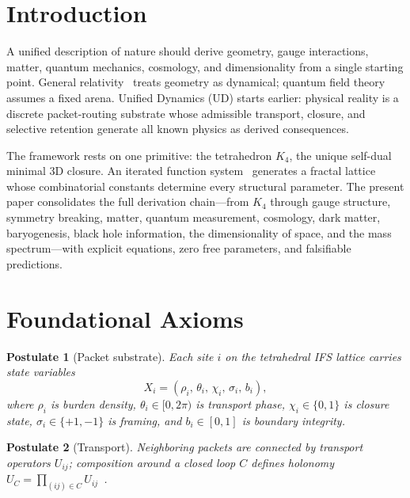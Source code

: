 \documentclass[11pt,twocolumn]{article}
\newtheorem{postulate}{Postulate}
\begin{document}

\section{Introduction}
\label{sec:intro}

A unified description of nature should derive geometry, gauge interactions, matter, quantum mechanics, cosmology, and dimensionality from a single starting point.
General relativity~\cite{einstein1915} treats geometry as dynamical; quantum field theory~\cite{yangmills1954} assumes a fixed arena.
Unified Dynamics (UD) starts earlier: physical reality is a discrete packet-routing substrate whose admissible transport, closure, and selective retention generate all known physics as derived consequences.

The framework rests on one primitive: the tetrahedron $K_4$, the unique self-dual minimal 3D closure.
An iterated function system~\cite{hutchinson1981,falconer2003} generates a fractal lattice whose combinatorial constants determine every structural parameter.
The present paper consolidates the full derivation chain---from $K_4$ through gauge structure, symmetry breaking, matter, quantum measurement, cosmology, dark matter, baryogenesis, black hole information, the dimensionality of space, and the mass spectrum---with explicit equations, zero free parameters, and falsifiable predictions.

\section{Foundational Axioms}
\label{sec:axioms}

\begin{postulate}[Packet substrate]
Each site $i$ on the tetrahedral IFS lattice carries state variables
\begin{equation}
X_i = (\rho_i,\,\theta_i,\,\chi_i,\,\sigma_i,\,b_i),
\label{eq:packet}
\end{equation}
where $\rho_i$ is burden density, $\theta_i\in[0,2\pi)$ is transport phase, $\chi_i\in\{0,1\}$ is closure state, $\sigma_i\in\{+1,-1\}$ is framing, and $b_i\in[0,1]$ is boundary integrity.
\end{postulate}

\begin{postulate}[Transport]
Neighboring packets are connected by transport operators $U_{ij}$; composition around a closed loop $C$ defines holonomy $U_C=\prod_{(ij)\in C}U_{ij}$~\cite{wilson1974}.
\end{postulate}
\end{document}
